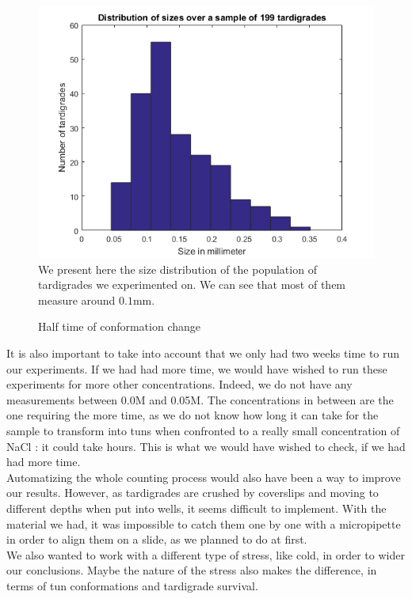 \documentclass[12pt,a4paper, twocolumn]{article}
\begin{document}
\begin{figure}
\includegraphics[width=\linewidth]{pop.png}
\label{pop}
We present here the size distribution of the population of tardigrades we experimented on. We can see that most of them measure around $0.1$mm.
\caption{Half time of conformation change}
\end{figure}


It is also important to take into account that we only had two weeks time to run our experiments. If we had had more time, we would have wished to run these experiments for more other concentrations. Indeed, we do not have any measurements between 0.0M and 0.05M. The concentrations in between are the one requiring the more time, as we do not know how long it can take for the sample to transform into tuns when confronted to a really small concentration of NaCl : it could take hours. This is what we would have wished to check, if we had had more time.\\

Automatizing the whole counting process would also have been a way to improve our results. However, as tardigrades are crushed by coverslips and moving to different depths when put into wells, it seems difficult to implement. With the material we had, it was impossible to catch them one by one with a micropipette in order to align them on a slide, as we planned to do at first. \\

We also wanted to work with a different type of stress, like cold, in order to wider our conclusions. Maybe the nature of the stress also makes the difference, in terms of tun conformations and tardigrade survival.\\
\end{document}
